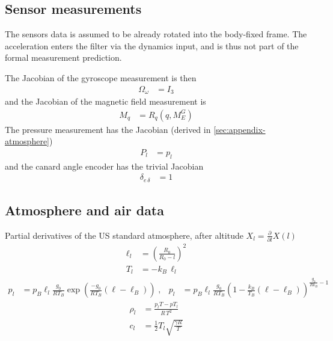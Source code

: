\subsection{Sensor measurements}
\label{sec:jacobians-sensors}
The sensors data is assumed to be already rotated into the body-fixed frame.
The acceleration enters the filter via the dynamics input, and is thus not part of the formal measurement prediction.

The Jacobian of the gyroscope measurement is then 
\begin{align}
    \Omega_\omega &= I_3
\end{align}
and the Jacobian of the magnetic field measurement is 
\begin{align}
    M_q &= R_q(q,M_E^G)
\end{align}
The pressure measurement has the Jacobian (derived in \autoref{sec:appendix-atmosphere})
\begin{align}
    P_l &= p_l
\end{align}
and the canard angle encoder has the trivial Jacobian 
\begin{align}
    \delta_{e \, \delta} &= 1
\end{align}

\subsection{Atmosphere and air data}
\label{sec:appendix-atmosphere}

Partial derivatives of the US standard atmosphere, after altitude $X_l = \frac{\partial}{\partial l} X(l)$
\begin{align}
    \ell_l &= \left(\frac{R_0}{R_0 - l}\right)^2 \\
    T_l &= -k_B \, \ell_l
\end{align}
\begin{align}
    p_l &= p_B \ell_l \frac{g_0}{R T_B} \exp \left( \frac{-g_0}{R T_B} (\ell-\ell_B) \right) \; , &
    p_l &= p_B \ell_l \frac{g_0}{R T_B} \left( 1 - \frac{k_B}{T_B} (\ell-\ell_B) \right) ^{\frac{g_0}{R k_B} -1}
\end{align}
\begin{align}
    \rho_l &= \frac{p_l T - p T_l}{R \, T^2} \\
    c_l &= \frac{1}{2} T_l \sqrt{\frac{\gamma R}{ T}}
\end{align}

